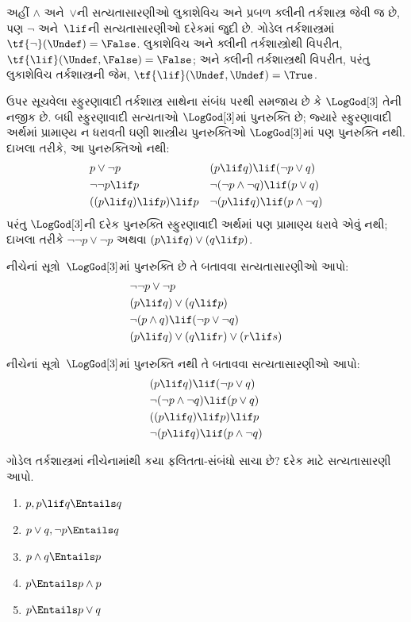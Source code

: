 \documentclass[../../../include/open-logic-section]{subfiles}
\begin{document}
અહીં $\land$ અને~$\lor$ની સત્યતાસારણીઓ લુકાશેવિચ અને પ્રબળ
ક્લીની તર્કશાસ્ત્ર જેવી જ છે, પણ $\lnot$ અને~$\lif$ની
સત્યતાસારણીઓ દરેકમાં જુદી છે. ગોડેલ તર્કશાસ્ત્રમાં
$\tf{\lnot}(\Undef) = \False$. લુકાશેવિચ અને ક્લીની
તર્કશાસ્ત્રોથી વિપરીત, $\tf{\lif}(\Undef, \False) = \False$;
અને ક્લીની તર્કશાસ્ત્રથી વિપરીત, પરંતુ લુકાશેવિચ તર્કશાસ્ત્રની જેમ,
$\tf{\lif}(\Undef, \Undef) = \True$.

ઉપર સૂચવેલા સ્ફુરણાવાદી તર્કશાસ્ત્ર સાથેના સંબંધ પરથી સમજાય છે કે
$\LogGod[3]$ તેની નજીક છે. બધી સ્ફુરણાવાદી સત્યતાઓ
$\LogGod[3]$માં પુનરુક્તિ છે; જ્યારે સ્ફુરણાવાદી અર્થમાં પ્રામાણ્ય
ન ધરાવતી ઘણી શાસ્ત્રીય પુનરુક્તિઓ $\LogGod[3]$માં પણ પુનરુક્તિ નથી.
દાખલા તરીકે, આ પુનરુક્તિઓ નથી:
\begin{align*}
  & p \lor \lnot p && (p \lif q) \lif (\lnot p \lor q) \\
  & \lnot\lnot p \lif p && \lnot(\lnot p \land \lnot q) \lif (p \lor q) \\
  & ((p \lif q) \lif p) \lif p && \lnot(p \lif q) \lif (p \land \lnot q)
\end{align*}
પરંતુ $\LogGod[3]$ની દરેક પુનરુક્તિ સ્ફુરણાવાદી અર્થમાં પણ
પ્રામાણ્ય ધરાવે એવું નથી; દાખલા તરીકે $\lnot\lnot p \lor \lnot p$
અથવા $(p \lif q) \lor (q \lif p)$.

\begin{prob}
  નીચેનાં સૂત્રો~$\LogGod[3]$માં પુનરુક્તિ છે તે બતાવવા
  સત્યતાસારણીઓ આપો:
  \begin{align*}
    & \lnot\lnot p \lor \lnot p\\
    & (p \lif q) \lor (q \lif p) \\
    & \lnot(p \land q) \lif (\lnot p \lor \lnot q) \\
    & (p \lif q) \lor (q \lif r) \lor (r \lif s)
  \end{align*}
\end{prob}

\begin{prob}
  નીચેનાં સૂત્રો~$\LogGod[3]$માં પુનરુક્તિ નથી તે બતાવવા
  સત્યતાસારણીઓ આપો:
  \begin{align*}
    & (p \lif q) \lif (\lnot p \lor q) \\
    & \lnot(\lnot p \land \lnot q) \lif (p \lor q) \\
    & ((p \lif q) \lif p) \lif p \\
    & \lnot(p \lif q) \lif (p \land \lnot q)
  \end{align*}
\end{prob}

\begin{prob}
  ગોડેલ તર્કશાસ્ત્રમાં નીચેનામાંથી કયા ફલિતતા-સંબંધો સાચા છે?
  દરેક માટે સત્યતાસારણી આપો.
  \begin{enumerate}
    \item $p, p \lif q \Entails q$
    \item $p \lor q, \lnot p \Entails q$
    \item $p \land q \Entails p$
    \item $p \Entails p \land p$
    \item $p \Entails p \lor q$
  \end{enumerate}
\end{prob}
\end{document}
